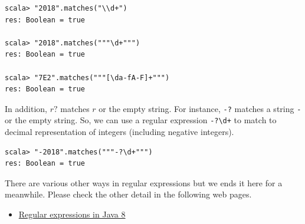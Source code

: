 \documentclass[11pt]{article}
\begin{document}
\begin{verbatim}
scala> "2018".matches("\\d+")
res: Boolean = true

scala> "2018".matches("""\d+""")
res: Boolean = true

scala> "7E2".matches("""[\da-fA-F]+""")
res: Boolean = true
\end{verbatim}

In addition, \(r?\) matches \(r\) or the empty string. 
For instance, \texttt{-?} matches a string \texttt{-} or the empty string.
So, we can use a regular expression \texttt{-?\textbackslash{}d+} to match to decimal 
representation of integers (including negative integers). 
\begin{verbatim}
scala> "-2018".matches("""-?\d+""")
res: Boolean = true
\end{verbatim}

There are various other ways in regular expressions but we ends it
here for a meanwhile. 
Please check the other detail in the following web pages. 

\begin{itemize}
\item \href{https://docs.oracle.com/javase/8/docs/api/java/util/regex/Pattern.html}{Regular expressions in Java 8}
\end{itemize}
\end{document}
